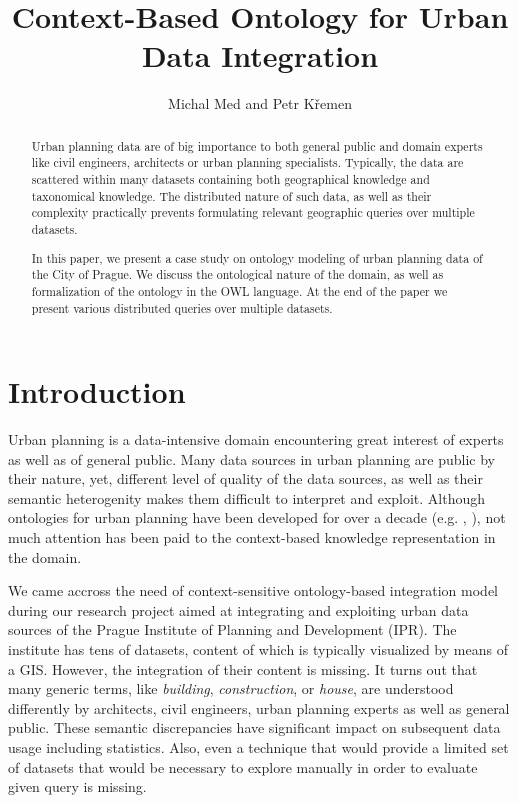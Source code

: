 \documentclass{lncs-template/llncs}
\begin{document}
\title{Context-Based Ontology for Urban Data Integration}

\author{Michal Med and Petr K\v{r}emen}

\maketitle

\begin{abstract}
Urban planning data are of big importance to both general public and domain experts like civil engineers, architects or urban planning specialists. Typically, the data are scattered within many datasets containing both geographical knowledge and taxonomical knowledge. The distributed nature of such data, as well as their complexity practically prevents formulating relevant geographic queries over multiple datasets. 

In this paper, we present a case study on ontology modeling of urban planning data of the City of Prague. We discuss the ontological nature of the domain, as well as formalization of the ontology in the OWL language. At the end of the paper we present various distributed queries over multiple datasets.
\end{abstract}

\section{Introduction}

Urban planning is a data-intensive domain encountering great interest of experts as well as of general public. Many data sources in urban planning are public by their nature, yet, different level of quality of the data sources, as well as their semantic heterogenity makes them difficult to interpret and exploit. Although ontologies for urban planning have been developed for over a decade (e.g. \cite{fonseca2000ontologies}, \cite{psyllidis2015ontology}), not much attention has been paid to the context-based knowledge representation in the domain. 

We came accross the need of context-sensitive ontology-based integration model during our research project aimed at integrating and exploiting urban data sources of the Prague Institute of Planning and Development (IPR). The institute has tens of datasets, content of which is typically visualized by means of a GIS. However, the integration of their content is missing. It turns out that many generic terms, like \emph{building}, \emph{construction}, or \emph{house}, are understood differently by architects, civil engineers, urban planning experts as well as general public. These semantic discrepancies have significant impact on subsequent data usage including statistics. Also, even a technique that would provide a limited set of datasets that would be necessary to explore manually in order to evaluate given query is missing.
\end{document}
